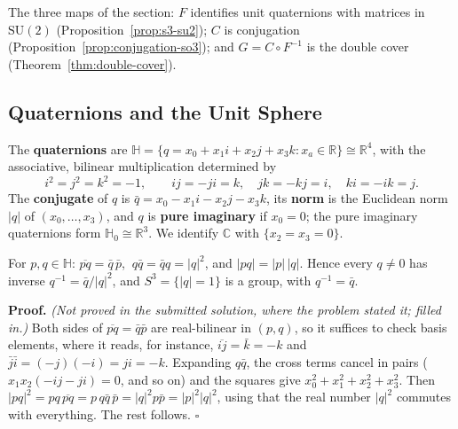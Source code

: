 \documentclass[11pt]{report}
\makeatletter
\newcounter{defcounter}[section]
\newcounter{thmcounter}[section]
\renewenvironment{proof}[1][Proof]{\noindent\textbf{#1.} }{\hfill$\square$\par\vspace{5pt}}
\newcommand{\thmlabel}[1]{\edef\@currentlabel{\arabic{section}.\arabic{thmcounter}}\label{#1}}
\newcommand{\deflabel}[1]{\edef\@currentlabel{\arabic{section}.\arabic{defcounter}}\label{#1}}
\newcommand{\leeref}[1]{\par\smallskip{\raggedleft\footnotesize\textsc{Lee}:\ #1\par}}
\makeatother
\begin{document}
The three maps of the section: $F$ identifies unit quaternions with matrices in $\mathrm{SU}(2)$ (Proposition~\ref{prop:s3-su2}); $C$ is conjugation (Proposition~\ref{prop:conjugation-so3}); and $G = C \circ F^{-1}$ is the double cover (Theorem~\ref{thm:double-cover}).

\subsection{Quaternions and the Unit Sphere}\label{sub:quaternions}

\begin{defbox}[Quaternions]\deflabel{def:quaternions}
The \textbf{quaternions} are $\mathbb{H} = \{ q = x_0 + x_1 i + x_2 j + x_3 k : x_a \in \mathbb{R} \} \cong \mathbb{R}^4$, with the associative, bilinear multiplication determined by
\[
i^2 = j^2 = k^2 = -1, \qquad ij = -ji = k, \quad jk = -kj = i, \quad ki = -ik = j .
\]
The \textbf{conjugate} of $q$ is $\bar q = x_0 - x_1 i - x_2 j - x_3 k$, its \textbf{norm} is the Euclidean norm $|q|$ of $(x_0, \ldots, x_3)$, and $q$ is \textbf{pure imaginary} if $x_0 = 0$; the pure imaginary quaternions form $\mathbb{H}_0 \cong \mathbb{R}^3$. We identify $\mathbb{C}$ with $\{x_2 = x_3 = 0\}$.
\leeref{Problem 7-22}
\end{defbox}

\begin{propbox}\thmlabel{prop:quaternion-norm}
For $p, q \in \mathbb{H}$: $\overline{pq} = \bar q\, \bar p$, $\ q \bar q = \bar q q = |q|^2$, and $|pq| = |p|\,|q|$. Hence every $q \neq 0$ has inverse $q^{-1} = \bar q / |q|^2$, and $S^3 = \{|q| = 1\}$ is a group, with $q^{-1} = \bar q$.
\end{propbox}

\begin{proof}
\textit{(Not proved in the submitted solution, where the problem stated it; filled in.)} Both sides of $\overline{pq} = \bar q \bar p$ are real-bilinear in $(p, q)$, so it suffices to check basis elements, where it reads, for instance, $\overline{ij} = \bar k = -k$ and $\bar j \bar i = (-j)(-i) = ji = -k$. Expanding $q \bar q$, the cross terms cancel in pairs ($x_1 x_2 (-ij - ji) = 0$, and so on) and the squares give $x_0^2 + x_1^2 + x_2^2 + x_3^2$. Then $|pq|^2 = pq\, \overline{pq} = p\, q \bar q\, \bar p = |q|^2 p \bar p = |p|^2 |q|^2$, using that the real number $|q|^2$ commutes with everything. The rest follows.
\end{proof}
\end{document}
